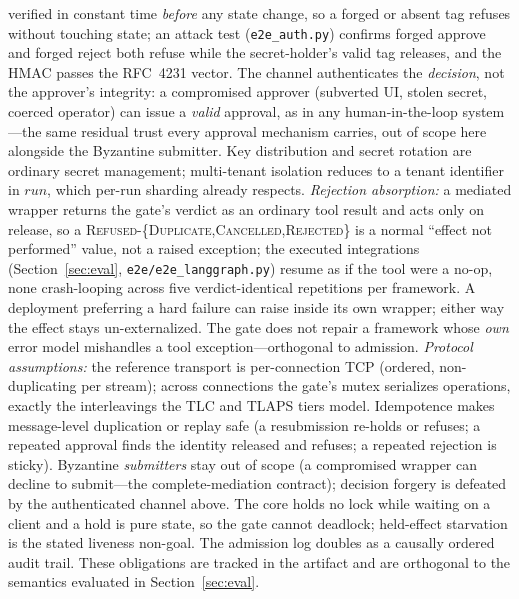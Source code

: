 \documentclass[10pt,journal,compsoc]{IEEEtran}
\begin{document}
verified in constant time \emph{before} any state change, so a forged or absent
tag refuses without touching state; an attack test (\texttt{e2e\_auth.py})
confirms forged approve and forged reject both refuse while the secret-holder's
valid tag releases, and the HMAC passes the RFC~4231 vector. The channel
authenticates the \emph{decision}, not the approver's integrity: a compromised
approver (subverted UI, stolen secret, coerced operator) can issue a
\emph{valid} approval, as in any human-in-the-loop system---the same residual
trust every approval mechanism carries, out of scope here alongside the
Byzantine submitter. Key distribution and secret rotation are ordinary secret
management; multi-tenant isolation reduces to a tenant identifier in
$\mathit{run}$, which per-run sharding already respects.
\emph{Rejection absorption:} a
mediated wrapper returns the gate's verdict as an ordinary tool result and acts
only on \textsf{release}, so a \textsc{Refused-\{Duplicate,Cancelled,Rejected\}}
is a normal ``effect not performed'' value, not a raised exception; the
executed integrations (Section~\ref{sec:eval}, \texttt{e2e/e2e\_langgraph.py})
resume as if the tool were a no-op, none crash-looping across five
verdict-identical repetitions per framework. A deployment preferring a hard
failure can raise inside its own wrapper; either way the effect stays
un-externalized. The gate does not repair a framework whose \emph{own} error
model mishandles a tool exception---orthogonal to admission.
\emph{Protocol assumptions:} the reference transport is
per-connection TCP (ordered, non-duplicating per stream); across connections
the gate's mutex serializes operations, exactly the interleavings the TLC and
TLAPS tiers model. Idempotence makes message-level duplication or replay safe
(a resubmission re-holds or refuses; a repeated approval finds the identity
released and refuses; a repeated rejection is sticky). Byzantine
\emph{submitters} stay out of scope (a compromised wrapper can decline to
submit---the complete-mediation contract); decision forgery is defeated by the
authenticated channel above. The core holds no lock while waiting on a client
and a hold is pure state, so the gate cannot deadlock; held-effect starvation
is the stated liveness non-goal. The admission log doubles as a causally
ordered audit trail. These obligations are tracked
in the artifact and are orthogonal to the semantics evaluated in
Section~\ref{sec:eval}.
\end{document}
